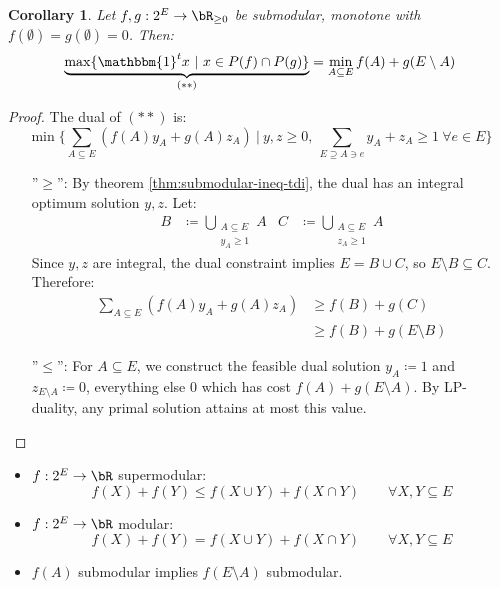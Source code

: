 \documentclass[11pt, a4paper]{article}
\newcommand{\set}[1]{\{#1\}}
\newtheorem{cor}[theorem]{Corollary}
\theoremstyle{remark}
\theoremstyle{definition}
\begin{document}
\begin{cor}\label{cor:submodular-min-max}
	Let $f,g: 2^E\to\bR_{\geq0}$ be submodular, monotone with $f(\emptyset)
		=g(\emptyset)=0$. Then:
	\[\underbrace{\max\set{\mathbbm{1}^tx\ |\ x\in P(f)\cap P(g)}}_{(**)}
		=\min_{A\subseteq E}f(A)+g(E\setminus A)\]
\end{cor}
\begin{proof}
	The dual of $(**)$ is:
	\[\min\set{\sum_{A\subseteq E}(f(A)y_A+g(A)z_A)\ |\
		y,z\geq0,\ \sum_{E\supseteq A\ni e}y_A+z_A\geq1\ \forall e\in E}\]

	\begin{enumerate}
		\item[''$\geq$'':]
		By theorem \ref{thm:submodular-ineq-tdi}, the dual has an integral
		optimum solution $y,z$. Let:
		\begin{align*}
			B & \coloneqq \bigcup_{\substack{A\subseteq E \\ y_A\geq1}}A &
			C & \coloneqq \bigcup_{\substack{A\subseteq E \\ z_A\geq1}}A
		\end{align*}
		Since $y,z$ are integral, the dual constraint implies $E=B\cup C$,
		so $E\setminus B\subseteq C$. Therefore:
		\begin{align*}
			\sum_{A\subseteq E}(f(A)y_A+g(A)z_A) & \geq f(B)+g(C)            \\
			                                     & \geq f(B)+g(E\setminus B)
		\end{align*}

		\item[''$\leq$'':]
		For $A\subseteq E$, we construct the feasible dual solution $y_A\coloneqq 1$
		and $z_{E\setminus A}\coloneqq 0$, everything else 0 which has cost
		$f(A)+g(E\setminus A)$. By LP-duality, any primal solution attains at
		most this value.
	\end{enumerate}
\end{proof}

\begin{itemize}
	\item
	$f: 2^E\to\bR$ supermodular:
	\[f(X)+f(Y)\leq f(X\cup Y)+f(X\cap Y) \qquad \forall X,Y\subseteq E\]

	\item
	$f: 2^E\to\bR$ modular:
	\[f(X)+f(Y)=f(X\cup Y)+f(X\cap Y) \qquad \forall X,Y\subseteq E\]

	\item
	$f(A)$ submodular implies $f(E\setminus A)$ submodular.
\end{itemize}
\end{document}
